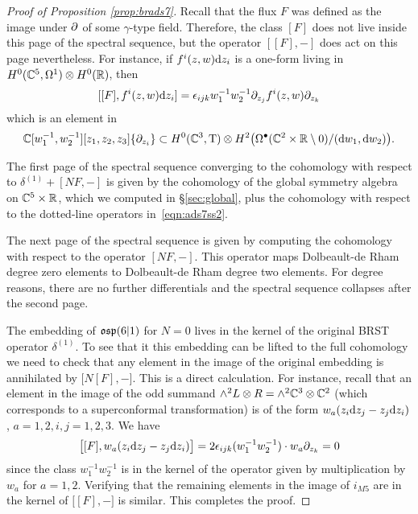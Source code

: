 \begin{proof}[Proof of Proposition \ref{prop:brads7}]
Recall that the flux $F$ was defined as the image under $\partial$ of some $\gamma$-type field. 
Therefore, the class $[F]$ does not live inside this page of the spectral sequence, but the operator $[[F], -]$ does act on this page nevertheless. 
For instance, if $f^i(z,w) {\rm d} z_i$ is a one-form living in $H^0(\mathbb C^5, \Omega^1) \otimes H^0(\mathbb R)$, then
\[
[ [F] , f^i (z,w) {\rm d} z_i ] = \epsilon_{ijk} w_1^{-1} w_2^{-1} \partial_{z_j} f^i(z,w) \partial_{z_k} 
\]
which is an element in 
\[
\mathbb C[w_1^{-1}, w_2^{-1}][z_1,z_2,z_3] \{\partial_{z_i}\} \subset H^0(\mathbb C^3, {\rm T}) \otimes H^2 \big(\Omega^\bullet(\mathbb C^2 \times \mathbb R \setminus 0) / ({\rm d} w_1 , {\rm d} w_2) \big) .
\]

The first page of the spectral sequence converging to the cohomology with respect to $\delta^{(1)} + [N F, -]$ is given by the cohomology of the global symmetry algebra on $\mathbb C^5 \times \mathbb R$, which we computed in \S \ref{sec:global}, plus the cohomology with respect to the dotted-line operators in~\eqref{eqn:ads7ss2}. 

The next page of the spectral sequence is given by computing the cohomology with respect to the operator $[N F,-]$. 
This operator maps Dolbeault-de Rham degree zero elements to Dolbeault-de Rham degree two elements. 
For degree reasons, there are no further differentials and the spectral sequence collapses after the second page. 

The embedding of $\mathfrak{osp}(6|1)$ for $N=0$ lives in the kernel of the original BRST operator $\delta^{(1)}$. 
To see that it this embedding can be lifted to the full cohomology we need to check that any element in the image of the original embedding is annihilated by $\big[ N [F] , - \big]$. 
This is a direct calculation. 
For instance, recall that an element in the image of the odd summand $\wedge^2 L \otimes R = \wedge^2 \mathbb C^3 \otimes \mathbb C^2$ (which corresponds to a superconformal transformation) is of the form $w_a (z_i {\rm d} z_j - z_j {\rm d} z_i)$, $a=1,2, i,j=1,2,3$. 
We have
\[
\big[[F] , w_a (z_i {\rm d} z_j - z_j {\rm d} z_i)\big] = 2 \epsilon_{ijk} (w_1^{-1} w_2^{-1}) \cdot w_a \partial_{z_k} = 0
\]
since the class $w_1^{-1} w_2^{-1}$ is in the kernel of the operator given by multiplication by $w_a$ for $a=1,2$.
Verifying that the remaining elements in the image of $i_{M5}$ are in the kernel of $\big[ [F], -\big]$ is similar.
This completes the proof.
\end{proof}

